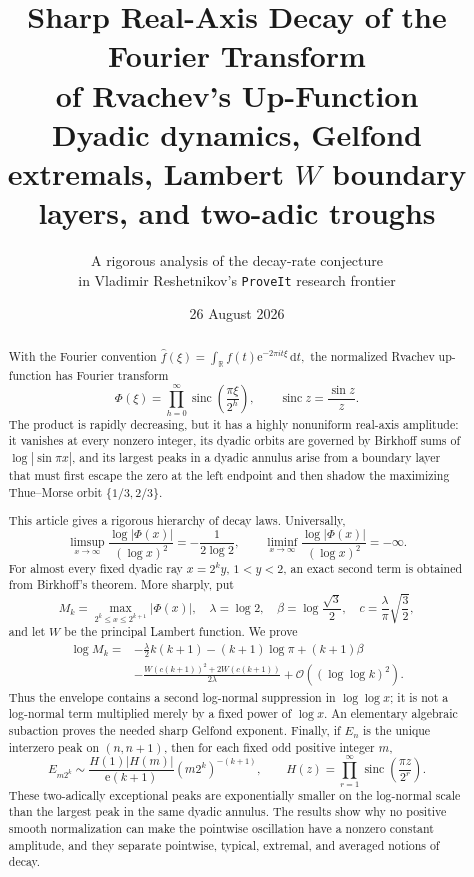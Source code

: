 \documentclass[11pt,oneside]{article}
\title{\bfseries Sharp Real-Axis Decay of the Fourier Transform\\
of Rvachev's Up-Function\\[0.35em]
\large Dyadic dynamics, Gelfond extremals, Lambert $W$ boundary layers, and two-adic troughs}
\author{A rigorous analysis of the decay-rate conjecture\\
\small in Vladimir Reshetnikov's \texttt{ProveIt} research frontier}
\date{26 August 2026}
\theoremstyle{definition}
\theoremstyle{remark}
\newcommand{\R}{\mathbb R}
\newcommand{\sinc}{\operatorname{sinc}}
\newcommand{\e}{\mathrm e}
\newcommand{\dd}{\,\mathrm d}
\newcommand{\bigO}{\mathcal O}
\newcommand{\PhiF}{\Phi}
\begin{document}
\maketitle

\begin{abstract}
With the Fourier convention
\(
 \widehat f(\xi)=\int_{\R}f(t)\e^{-2\pi i t\xi}\dd t,
\)
the normalized Rvachev up-function has Fourier transform
\[
 \PhiF(\xi)=\prod_{h=0}^{\infty}
 \sinc\!\left(\frac{\pi\xi}{2^h}\right),
 \qquad \sinc z=\frac{\sin z}{z}.
\]
The product is rapidly decreasing, but it has a highly nonuniform real-axis
amplitude: it vanishes at every nonzero integer, its dyadic orbits are governed
by Birkhoff sums of \(\log|\sin \pi x|\), and its largest peaks in a dyadic
annulus arise from a boundary layer that must first escape the zero at the
left endpoint and then shadow the maximizing Thue--Morse orbit
\(\{1/3,2/3\}\).

This article gives a rigorous hierarchy of decay laws.  Universally,
\[
 \limsup_{x\to\infty}
 \frac{\log|\PhiF(x)|}{(\log x)^2}
 =-\frac{1}{2\log 2},
 \qquad
 \liminf_{x\to\infty}
 \frac{\log|\PhiF(x)|}{(\log x)^2}=-\infty.
\]
For almost every fixed dyadic ray \(x=2^k y\), \(1<y<2\), an exact second
term is obtained from Birkhoff's theorem.  More sharply, put
\[
 M_k=\max_{2^k\le x\le 2^{k+1}}|\PhiF(x)|,
 \quad \lambda=\log 2,
 \quad \beta=\log\frac{\sqrt3}{2},
 \quad c=\frac{\lambda}{\pi}\sqrt{\frac32},
\]
and let \(W\) be the principal Lambert function.  We prove
\begin{align*}
 \log M_k={}&-\frac{\lambda}{2}k(k+1)
 -(k+1)\log\pi+(k+1)\beta\\
 &-\frac{W(c(k+1))^2+2W(c(k+1))}{2\lambda}
 +\bigO\!\left((\log\log k)^2\right).
\end{align*}
Thus the envelope contains a second log-normal suppression in
\(\log\log x\); it is not a log-normal term multiplied merely by a fixed
power of \(\log x\).  An elementary algebraic subaction proves the needed
sharp Gelfond exponent.  Finally, if \(E_n\) is the unique interzero peak on
\((n,n+1)\), then for each fixed odd positive integer \(m\),
\[
 E_{m2^k}\sim
 \frac{H(1)|H(m)|}{\e(k+1)}(m2^k)^{-(k+1)},
 \qquad
 H(z)=\prod_{r=1}^{\infty}\sinc\!\left(\frac{\pi z}{2^r}\right).
\]
These two-adically exceptional peaks are exponentially smaller on the
log-normal scale than the largest peak in the same dyadic annulus.  The
results show why no positive smooth normalization can make the pointwise
oscillation have a nonzero constant amplitude, and they separate pointwise,
typical, extremal, and averaged notions of decay.
\end{abstract}
\end{document}

